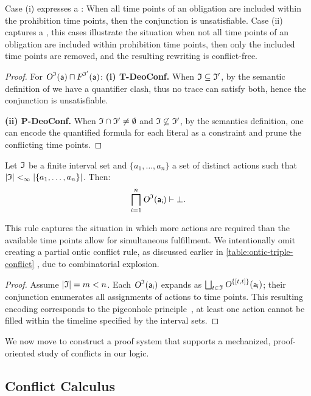 \noindent
Case (i) expresses a : When all time points of an obligation are included within the prohibition time points, then the conjunction is unsatisfiable. 
Case (ii) captures a , this cases illustrate the situation when not all time points of an obligation are included within prohibition time points, then only the included time points are removed, and the resulting rewriting is conflict-free.

\begin{proof}

For $\textsl{O}^{\mathfrak{I}}(\mathsf{a}) \sqcap \textsl{F}^{\mathfrak{I}'}(\mathsf{a})$:
\textbf{(i) T-DeoConf.}  
 When $\mathfrak{I} \subseteq \mathfrak{I}'$,  by the semantic definition of \TDDLfm we have a quantifier clash, thus no trace can satisfy both, hence the conjunction is unsatisfiable.

\smallskip
\textbf{(ii) P-DeoConf.}  
When $\mathfrak{I}\cap\mathfrak{I}'\neq\emptyset$ and $\mathfrak{I}\not\subseteq\mathfrak{I}'$, by the semantics definition, one can encode the quantified formula for each literal as a constraint and prune the conflicting time points.
\end{proof}

\begin{lemma}\label{lemma:ontic-conflict}
Let $\mathfrak{I}$ be a finite interval set and $\{a_1,\dots,a_n\}$ a set of distinct actions such that
$\vert \mathfrak{I}\vert <_\infty \vert \{a_1,\dots,a_n\}\vert$.  
Then:
\[
\bigsqcap_{i=1}^{n} \textsl{O}^{\mathfrak{I}}(\mathsf{a_i}) \vdash  \bot.
\]
\end{lemma}

\noindent
This rule captures the situation in which more actions are required than the available time points allow for simultaneous fulfillment.  
We intentionally omit creating a partial ontic conflict rule, as discussed earlier in \ref{table:ontic-triple-conflict} , due to combinatorial explosion.

\begin{proof}
Assume $\vert \mathfrak{I}\vert=m<n$.  
Each $\textsl{O}^{\mathfrak{I}}(\mathsf{a_i})$ expands as $\bigsqcup_{t\in\mathfrak{I}}\textsl{O}^{\{[t,t]\}}(\mathsf{a_i})$; their conjunction enumerates all assignments of actions to time points.  
This resulting encoding corresponds to the pigeonhole principle~\cite{Dirichlet1834Vorlesungen,ajtai1994complexity}, at least one action cannot be filled within the timeline specified by the interval sets.
\end{proof}
We now move to construct a proof system that supports a mechanized, proof-oriented study of conflicts in our logic.
\subsection{Conflict Calculus}

